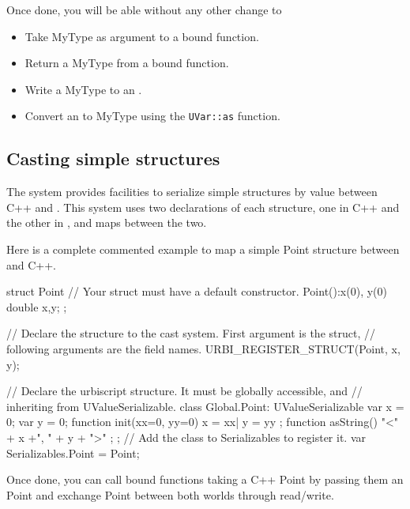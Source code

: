Once done, you will be able without any other change to
\begin{itemize}
\item Take MyType as argument to a bound function.
\item Return a MyType from a bound function.
\item Write a MyType to an \UVar.
\item Convert an \UVar to MyType using the \lstinline{UVar::as} function.
\end{itemize}

\subsection{Casting simple structures}

The system provides facilities to serialize simple structures by value between
C++ and \us. This system uses two declarations of each structure, one in
C++ and the other in \urbi, and maps between the two.

Here is a complete commented example to map a simple Point structure between
\us and C++.
\begin{cxx}
struct Point
{
  // Your struct must have a default constructor.
  Point():x(0), y(0) {}
  double x,y;
};

// Declare the structure to the cast system. First argument is the struct,
// following arguments are the field names.
URBI_REGISTER_STRUCT(Point, x, y);
\end{cxx}

\begin{urbiunchecked}
// Declare the urbiscript structure. It must be globally accessible, and
// inheriting from UValueSerializable.
class Global.Point: UValueSerializable
{
  var x = 0;
  var y = 0;
  function init(xx=0, yy=0)
  {
     x = xx|
     y = yy
  };
  function asString()
  {
    "<" + x +", " + y  + ">"
  };
};
// Add the class to Serializables to register it.
var Serializables.Point = Point;
\end{urbiunchecked}

Once done, you can call bound functions taking a C++ Point by passing them
an \us Point and exchange Point between both worlds through \UVar read/write.

